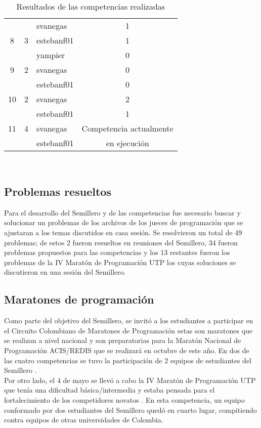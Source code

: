 \documentclass[conference]{IEEEtran}
\begin{document}
\begin{table}
\begin{tabular}{|c|c|l|c|}
		\hline
		  &   & svanegas & 1\\
		8 & 3 & estebanf01 & 1\\
		  &   & yampier & 0\\
		\hline
		9 & 2 & svanegas & 0\\
		  &   & estebanf01 & 0\\
		\hline
		10 & 2 & svanegas & 2\\
		   &   & estebanf01 & 1\\
		\hline
		11 & 4 & svanegas & Competencia actualmente\\
		   &   & estebanf01 & en ejecución\\
		\hline
	\end{tabular} 
	
	\quad\\
	\caption{Resultados de las competencias realizadas}
	\label{Tabla:competencias}
\end{table}

\subsection{Problemas resueltos}
Para el desarrollo del Semillero y de las competencias fue necesario buscar y solucionar un problemas de los archivos de los jueces de programación que se ajustaran a los temas discutidos en casa sesión. Se resolvieron un total de 49 problemas; de estos 2 fueron resueltos en reuniones del Semillero, 34 fueron problemas propuestos para las competencias y los 13 restantes fueron los problemas de la IV Maratón de Programación UTP los cuyas soluciones se discutieron en una sesión del Semillero. 

\subsection{Maratones de programación}
Como parte del objetivo del Semillero, se invitó a los estudiantes a participar en el Circuito Colombiano de Maratones de Programación estas son maratones que se realizan a nivel nacional y son preparatorias para la Maratón Nacional de Programación ACIS/REDIS que se realizará en octubre de este año. En dos de las cuatro competencias se tuvo la participación de 2 equipos de estudiantes del Semillero \cite{CCMP}.\\
Por otro lado, el 4 de mayo se llevó a cabo la IV Maratón de Programación UTP que tenía una dificultad básica/intermedia y estaba pensada para el fortalecimiento de los competidores novatos \cite{UTP}. En esta competencia, un equipo conformado por dos estudiantes del Semillero quedó en cuarto lugar, compitiendo contra equipos de otras universidades de Colombia.\\
\end{document}
